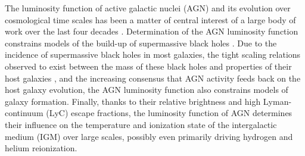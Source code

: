 \documentclass[fleqn,usenatbib]{mnras}
\begin{document}
The luminosity function of active galactic nuclei (AGN) and its
evolution over cosmological time scales has been a matter of central
interest of a large body of work over the last four decades
\citep[e.g.,][]{1978A&A....68...17M, 1983ApJ...269..352S,
  1988ApJ...325...92K, 1988MNRAS.235..935B, 1993ApJ...406L..43H,
  1994ApJ...421..412W, 1995AJ....110...68S, 1995AJ....110.2553K,
  1995ApJ...438..623P, 2000MNRAS.317.1014B, 2001AJ....121...54F,
  2004AJ....128..515F, 2006AJ....131.2766R, 2007ApJ...654..731H,
  2009MNRAS.392...19C, 2010AJ....139..906W, 2011ApJ...728L..26G,
  2013ApJ...773...14R, 2013ApJ...768..105M, 2015AA...578A..83G,
  2015ApJ...798...28K, 2016ApJ...829...33Y, 2016ApJ...833..222J,
  2017MNRAS.466.1160M}.  Determination of the AGN luminosity function
constrains models of the build-up of supermassive black holes
\citep{2015MNRAS.452..575S, 2016MNRAS.462..190R}.
Due to the
incidence of supermassive black holes in most galaxies, the tight
scaling relations observed to exist between the mass of these black
holes and properties of their host galaxies
\citep{2013ARA&A..51..511K, 2013ApJ...764..184M}, and the increasing
consensus that AGN activity feeds back on the host galaxy evolution,
the AGN luminosity function also constrains models of galaxy
formation.  Finally, thanks to their relative brightness and high
Lyman-continuum (LyC) escape fractions, the luminosity function of AGN
determines their influence on the temperature and ionization state of
the intergalactic medium (IGM) over large scales,
possibly even
primarily driving hydrogen and helium reionization.  
\end{document}
